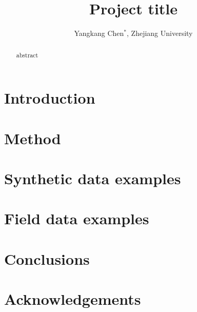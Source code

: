 \documentclass[]{segabs}
\begin{document}
\title{Project title}

\author{Yangkang Chen$^*$, Zhejiang University}

\maketitle

\begin{abstract}
abstract
\end{abstract}

\section{Introduction}

\section{Method}

\section{Synthetic data examples}

\section{Field data examples}

 
\section{Conclusions}


\section{Acknowledgements}


\onecolumn


\end{document}
